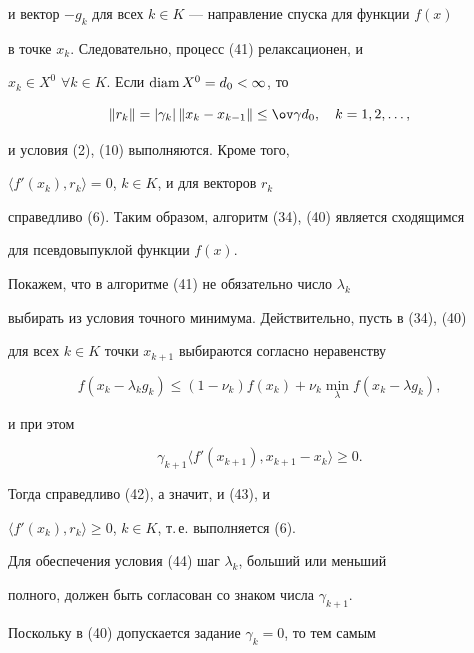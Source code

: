 и вектор $-g_k$ для всех $k\in K$ --- направление спуска для функции $f(x)$ 


в точке $x_k$. Следовательно, процесс (41) релаксационен, и


$x_k\in X^0$ $\forall k\in K$. Если $\operatorname{diam} X^0=d_0<\infty$, то


\begin{equation}


\|r_k\| =|\gamma_k|\, \|x_k-x_{k-1}\| \leq 


\ov \gamma d_0,\quad k=1,2,\dotsc,


\end{equation}


и условия (2), (10) выполняются. Кроме того,


$\langle f'(x_k),r_k\rangle =0$, $k\in K$, и для векторов $r_k$ 


справедливо (6). Таким образом, алгоритм (34), (40) является сходящимся 


для псевдовыпуклой функции $f(x)$.





Покажем, что в алгоритме (41) не обязательно число $\lambda_k$ 


выбирать из условия точного минимума. Действительно, пусть в (34), (40) 


для всех $k\in K$ точки $x_{k+1}$ выбираются согласно неравенству 


$$


f(x_k-\lambda_kg_k)\leq (1-\nu_k)f(x_k)+\nu_k \min_{\lambda}


f(x_k-\lambda g_k),


$$


и при этом 


\begin{equation}


\gamma_{k+1}\langle {{f}'(x_{k+1}),x_{k+1}-x_k} \rangle \geq 0.


\end{equation}


Тогда справедливо (42), а значит, и (43), и


$\langle f'(x_k),r_k\rangle \geq 0$, $k\in K$, т.\,е.{} выполняется (6).


Для обеспечения условия (44) шаг $\lambda_k$, больший или меньший


полного, должен быть согласован со знаком числа $\gamma_{k+1}$.


Поскольку в (40) допускается задание $\gamma_k=0$, то тем самым


